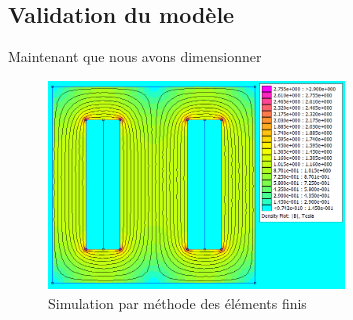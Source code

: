 \newpage
\subsection{Validation du modèle}
Maintenant que nous avons dimensionner


\begin{figure}[h]
	\begin{center}
	\includegraphics[width=0.7\textwidth]{images/TP1_FEMM_validation}
	\caption{Simulation par méthode des éléments finis}\label{img:FEMMvalidation}
	\end{center}
\end{figure}
\FloatBarrier 
